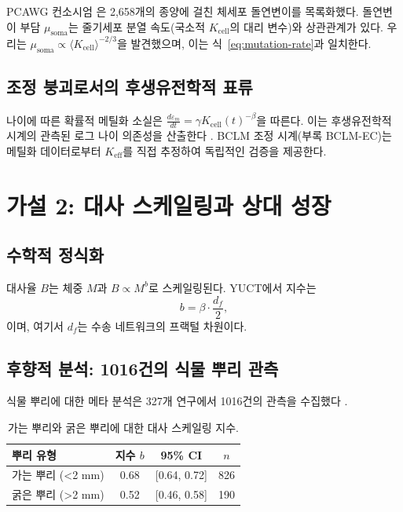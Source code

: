 \documentclass[11pt,a4paper]{article}
\begin{document}
	PCAWG 컨소시엄 \cite{PCAWG2020}은 2,658개의 종양에 걸친 체세포 돌연변이를 목록화했다. 돌연변이 부담 \(\mu_{\text{soma}}\)는 줄기세포 분열 속도(국소적 \(K_{\text{cell}}\)의 대리 변수)와 상관관계가 있다. 우리는 \(\mu_{\text{soma}} \propto \langle K_{\text{cell}} \rangle^{-2/3}\)을 발견했으며, 이는 식~\eqref{eq:mutation-rate}과 일치한다.
	
	\subsection{조정 붕괴로서의 후생유전학적 표류}
	
	나이에 따른 확률적 메틸화 소실은 \(\frac{d\varepsilon_m}{dt} = \gamma K_{\text{cell}}(t)^{-\beta}\)을 따른다. 이는 후생유전학적 시계의 관측된 로그 나이 의존성을 산출한다 \cite{Horvath2013, Lu2023}. BCLM 조정 시계(부록 BCLM-EC)는 메틸화 데이터로부터 \(K_{\mathrm{eff}}\)를 직접 추정하여 독립적인 검증을 제공한다.
	
	\section{가설 2: 대사 스케일링과 상대 성장}
	
	\subsection{수학적 정식화}
	
	대사율 \(B\)는 체중 \(M\)과 \(B \propto M^{b}\)로 스케일링된다. YUCT에서 지수는
	\begin{equation}
		b = \beta \cdot \frac{d_f}{2},
		\label{eq:metabolic-scaling}
	\end{equation}
	이며, 여기서 \(d_f\)는 수송 네트워크의 프랙털 차원이다.
	
	\subsection{후향적 분석: 1016건의 식물 뿌리 관측}
	
	식물 뿌리에 대한 메타 분석은 327개 연구에서 1016건의 관측을 수집했다 \cite{Yuan2020}.
	
	\begin{table}[H]
		\centering
		\caption{가는 뿌리와 굵은 뿌리에 대한 대사 스케일링 지수.}
		\label{tab:plant-scaling}
		\begin{tabular}{lccc}
			\toprule
			\textbf{뿌리 유형} & \textbf{지수 \(b\)} & \textbf{95\% CI} & \textbf{\(n\)} \\
			\midrule
			가는 뿌리 (<2 mm) & 0.68 & [0.64, 0.72] & 826 \\
			굵은 뿌리 (>2 mm) & 0.52 & [0.46, 0.58] & 190 \\
			\bottomrule
		\end{tabular}
	\end{table}
	
\end{document}
